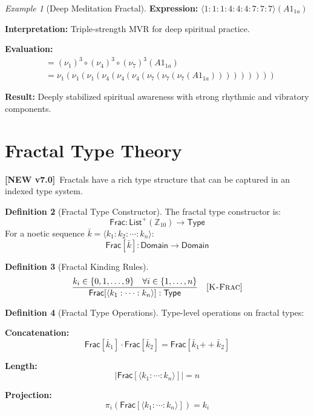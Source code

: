 \documentclass[11pt,twoside,openright]{book}
\theoremstyle{definition}
\newtheorem{definition}{Definition}[chapter]
\theoremstyle{plain}
\theoremstyle{remark}
\newtheorem{example}[definition]{Example}
\newcommand{\noe}[1]{\nu_{#1}}
\newcommand{\vnew}{\textcolor{blue!70!black}{\textbf{[NEW v7.0]}}}
\begin{document}
\begin{example}[Deep Meditation Fractal]
\label{ex:deep-meditation}
\textbf{Expression:} $\langle 1 : 1 : 1 : 4 : 4 : 4 : 7 : 7 : 7 \rangle(A1_{1a})$

\textbf{Interpretation:} Triple-strength MVR for deep spiritual practice.

\textbf{Evaluation:}
\begin{align}
&= (\noe{1})^3 \circ (\noe{4})^3 \circ (\noe{7})^3 (A1_{1a}) \\
&= \noe{1}(\noe{1}(\noe{1}(\noe{4}(\noe{4}(\noe{4}(\noe{7}(\noe{7}(\noe{7}(A1_{1a})))))))))
\end{align}

\textbf{Result:} Deeply stabilized spiritual awareness with strong rhythmic and vibratory components.
\end{example}


\section{Fractal Type Theory}
\label{sec:fractal-types}

\vnew\ Fractals have a rich type structure that can be captured in an indexed type system.

\begin{definition}[Fractal Type Constructor]
\label{def:fractal-type-ctor}
The fractal type constructor is:
\[
\mathsf{Frac} : \mathsf{List}^+(\mathbb{Z}_{10}) \to \mathsf{Type}
\]
For a noetic sequence $\bar{k} = \langle k_1 : k_2 : \cdots : k_n \rangle$:
\[
\mathsf{Frac}[\bar{k}] : \mathsf{Domain} \to \mathsf{Domain}
\]
\end{definition}

\begin{definition}[Fractal Kinding Rules]
\label{def:fractal-kinding}
\[
\frac{k_i \in \{0, 1, \ldots, 9\} \quad \forall i \in \{1, \ldots, n\}}
{\mathsf{Frac}[\langle k_1 : \cdots : k_n \rangle] : \mathsf{Type}} \quad [\textsc{K-Frac}]
\]
\end{definition}

\begin{definition}[Fractal Type Operations]
\label{def:fractal-type-ops}
Type-level operations on fractal types:

\textbf{Concatenation:}
\[
\mathsf{Frac}[\bar{k}_1] \cdot \mathsf{Frac}[\bar{k}_2] = \mathsf{Frac}[\bar{k}_1 \mathbin{+\!\!+} \bar{k}_2]
\]

\textbf{Length:}
\[
|\mathsf{Frac}[\langle k_1 : \cdots : k_n \rangle]| = n
\]

\textbf{Projection:}
\[
\pi_i(\mathsf{Frac}[\langle k_1 : \cdots : k_n \rangle]) = k_i
\]
\end{definition}
\end{document}
